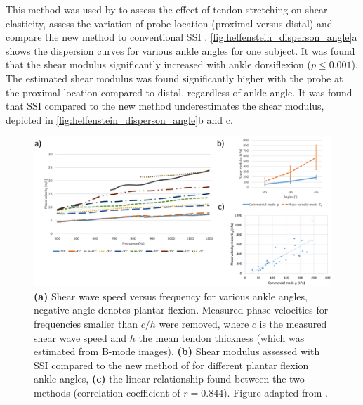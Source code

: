 This method was used by \citeauthor{helfenstein-didier_vivo_2016} to assess the effect of tendon stretching on shear elasticity, assess the variation of probe location (proximal versus distal) and compare the new method to conventional SSI \cite{helfenstein-didier_vivo_2016}. \autoref{fig:helfenstein_disperson_angle}a shows the dispersion curves for various ankle angles for one subject. It was found that the shear modulus significantly increased with ankle dorsiflexion ($p\leq 0.001$). The estimated shear modulus was found significantly higher with the probe at the proximal location compared to distal, regardless of ankle angle. It was found that SSI compared to the new method underestimates the shear modulus, depicted in \autoref{fig:helfenstein_disperson_angle}b and c. 


\begin{figure}[t]
	\centering
	\includegraphics[width=\linewidth]{Figures/elastography/helfenstein_dispersion_angle.png}
	\caption{\textbf{(a)} Shear wave speed versus frequency for various ankle angles, negative angle denotes plantar flexion. Measured phase velocities for frequencies smaller than $c/h$ were removed, where $c$ is the measured shear wave speed and $h$ the mean tendon thickness (which was estimated from B-mode images). \textbf{(b)} Shear modulus assessed with SSI compared to the new method of \cite{brum_vivo_2014} for different plantar flexion ankle angles, \textbf{(c)} the linear relationship found between the two methods (correlation coefficient of $r=0.844$). Figure adapted from \citet{helfenstein-didier_vivo_2016}.}
	\label{fig:helfenstein_disperson_angle}
\end{figure}

